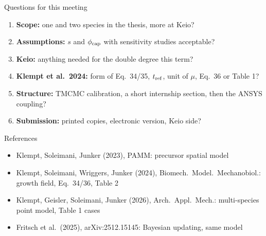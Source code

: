 \documentclass[aspectratio=169,11pt]{beamer}
\begin{document}
\begin{frame}{Questions for this meeting}
\begin{enumerate}
  \item \textbf{Scope:} one and two species in the thesis, more at Keio?
  \item \textbf{Assumptions:} $s$ and $\phi_{\rm cap}$ with sensitivity studies acceptable?
  \item \textbf{Keio:} anything needed for the double degree this term?
  \item \textbf{Klempt et al.\ 2024:} form of Eq.\ 34/35, $t_{\rm ref}$, unit of $\mu$, Eq.\ 36 or Table 1?
  \item \textbf{Structure:} TMCMC calibration, a short internship section, then the ANSYS coupling?
  \item \textbf{Submission:} printed copies, electronic version, Keio side?
\end{enumerate}
\end{frame}

\begin{frame}{References}
\small
\begin{itemize}
  \item Klempt, Soleimani, Junker (2023), PAMM: precursor spatial model
  \item Klempt, Soleimani, Wriggers, Junker (2024), Biomech.\ Model.\ Mechanobiol.:
        growth field, Eq.\ 34/36, Table 2
  \item Klempt, Geisler, Soleimani, Junker (2026), Arch.\ Appl.\ Mech.:
        multi-species point model, Table 1 cases
  \item Fritsch et al.\ (2025), arXiv:2512.15145: Bayesian updating, same model
\end{itemize}
\end{frame}
\end{document}
